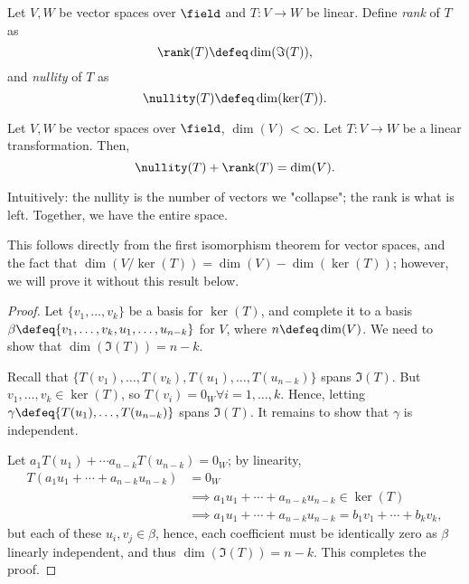 \begin{definition}
    Let $V, W$ be vector spaces over $\field$ and $T: V \to W$ be linear. Define \emph{rank} of $T$ as \[
    \rank(T) \defeq \dim (\Im(T)),
    \]
    and \emph{nullity} of $T$ as \[
    \nullity(T) \defeq \dim(\ker(T)).    
    \]
\end{definition}

\begin{theorem}\label{thm:ranknullity}
    Let $V, W$ be vector spaces over $\field$, $\dim (V) < \infty$. Let $T: V \to W$ be a linear transformation. Then, \[
        \nullity(T) + \rank(T) = \dim(V).    
    \]
\end{theorem}

\begin{remark}
    Intuitively: the nullity is the number of vectors we "collapse"; the rank is what is left. Together, we have the entire space.
\end{remark}

\begin{remark}
    This follows directly from the first isomorphism theorem for vector spaces, and the fact that $\dim(V / \ker (T)) = \dim (V) - \dim (\ker (T))$; however, we will prove it without this result below.
\end{remark}

\begin{proof}
        Let $\{v_1, \dots, v_k\}$ be a basis for $\ker (T)$, and complete it to a basis $\beta \defeq \{v_1, \dots, v_k, u_1, \dots, u_{n-k}\}$ for $V$,  where $n \defeq \dim (V)$. We need to show that $\dim(\Im(T)) = n-k$.

        Recall that $\{T(v_1), \dots, T(v_k), T(u_1), \dots, T(u_{n-k})\}$ spans $\Im(T)$. But $v_1, \dots, v_k \in \ker (T)$, so $T(v_i) = 0_W \forall i = 1, \dots, k$. Hence, letting $\gamma \defeq \{T(u_1), \dots, T(u_{n-k})\}$ spans $\Im(T)$. It remains to show that $\gamma$ is independent.

        Let $a_1 T(u_1) + \cdots a_{n-k} T(u_{n-k}) = 0_W$; by linearity, \begin{align*}
            T(a_1 u_1 + \cdots+ a_{n-k} u_{n-k}) &= 0_W\\
            &\implies a_1 u_1 +\cdots  + a_{n-k} u_{n-k} \in \ker (T)\\
            &\implies a_1 u_1 + \cdots + a_{n-k}u_{n-k} = b_1 v_1 + \cdots + b_k v_k,
        \end{align*}
        but each of these $u_i, v_j \in \beta$, hence, each coefficient must be identically zero as $\beta$ linearly independent, and thus $\dim (\Im(T)) = n -k$. This completes the proof.
\end{proof}

